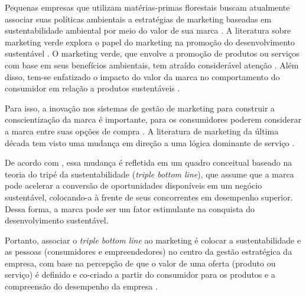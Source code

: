 
Pequenas empresas que utilizam matérias-primas florestais buscam atualmente associar suas políticas ambientais a estratégias de marketing baseadas em sustentabilidade ambiental por meio do valor de sua marca \cite{Fardin2020RollerBases}. A literatura sobre marketing verde explora o papel do marketing na promoção do desenvolvimento sustentável \cite{Cheng2022TheAttachment}. O marketing verde, que envolve a promoção de produtos ou serviços com base em seus benefícios ambientais, tem atraído considerável atenção \cite{Parguel2011HowCommunication}. Além disso, tem-se enfatizado o impacto do valor da marca no comportamento do consumidor em relação a produtos sustentáveis \cite{Wang2021TheUK,Hameed2021GreenwashPerspective}.

Para isso, a inovação nos sistemas de gestão de marketing para construir a conscientização da marca é importante, para os consumidores poderem considerar a marca entre suas opções de compra \cite{Cheng2022ImpactSelection}. A literatura de marketing da última década tem visto uma mudança em direção a uma lógica dominante de serviço \cite{Brodie2011CustomerResearch}. 

De acordo com , essa mudança é refletida em um quadro conceitual baseado na teoria do tripé da sustentabilidade (\textit{triple bottom line}), que assume que a marca pode acelerar a conversão de oportunidades disponíveis em um negócio sustentável, colocando-a à frente de seus concorrentes em desempenho superior. Dessa forma, a marca pode ser um fator estimulante na conquista do desenvolvimento sustentável.

Portanto, associar o \textit{triple bottom line} ao marketing é colocar a sustentabilidade e as pessoas (consumidores e empreendedores) no centro da gestão estratégica da empresa, com base na percepção de que o valor de uma oferta (produto ou serviço) é definido e co-criado a partir do consumidor para os produtos e a compreensão do desempenho da empresa \cite{Becker2020CustomerResearch,Hunt2017StrategicResearch}.

